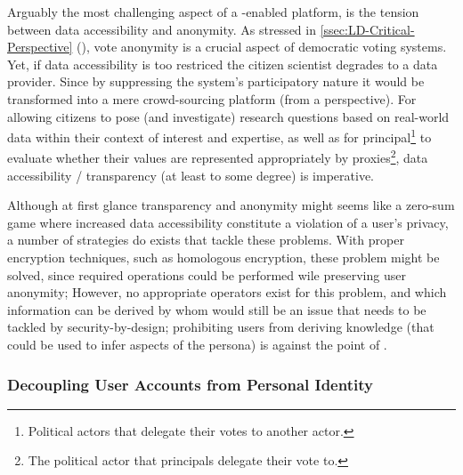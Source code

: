 Arguably the most challenging aspect of a -enabled  platform, is the tension between data accessibility and anonymity. As stressed in \ref{ssec:LD-Critical-Perspective} (), vote anonymity is a crucial aspect of democratic voting systems. Yet, if data accessibility is too restriced the citizen scientist degrades to a data provider. Since by suppressing the system’s participatory nature it would be transformed into a mere crowd-sourcing platform (from a  perspective). For allowing citizens to pose (and investigate) research questions based on real-world data within their context of interest and expertise, as well as for principal\footnote{Political actors that delegate their votes to another actor.} to evaluate whether their values are represented appropriately by proxies\footnote{The political actor that principals delegate their vote to.}, data accessibility / transparency (at least to some degree) is imperative.

Although at first glance transparency and anonymity might seems like a zero-sum game where increased data accessibility constitute a violation of a user’s privacy, a number of strategies do exists that tackle these problems. With proper encryption techniques, such as homologous encryption, these problem might be solved, since required operations could be performed wile preserving user anonymity; However, no appropriate operators exist for this problem, and which information can be derived by whom would still be an issue that needs to be tackled by security-by-design; prohibiting users from deriving knowledge (that could be used to infer aspects of the persona) is against the point of .

\subsubsection{Decoupling User Accounts from Personal Identity}

